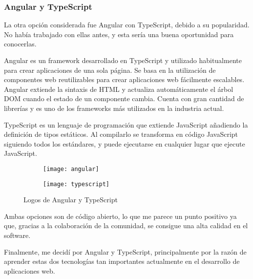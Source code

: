 \subsubsection{Angular y TypeScript}
La otra opción considerada fue Angular con TypeScript, debido a su popularidad. No había trabajado con ellas antes, y esta sería una buena oportunidad para conocerlas.\\
\par Angular es un framework desarrollado en TypeScript y utilizado habitualmente para crear aplicaciones de una sola página. Se basa en la utilización de componentes web reutilizables para crear aplicaciones web fácilmente escalables. Angular extiende la sintaxis de HTML y actualiza automáticamente el árbol DOM cuando el estado de un componente cambia. Cuenta con gran cantidad de librerías y es uno de los frameworks más utilizados en la industria actual\cite{Angular}.\\
\par TypeScript es un lenguaje de programación que extiende JavaScript añadiendo la definición de tipos estáticos. Al compilarlo se transforma en código JavaScript siguiendo todos los estándares, y puede ejecutarse en cualquier lugar que ejecute JavaScript\cite{TypeScript}.
\begin{figure}[H]
	\begin{subfigure}{0.5\textwidth}
	\centering
	\texttt{[image: angular]}
	\end{subfigure}
	\begin{subfigure}{0.5\textwidth}
	\centering
	\texttt{[image: typescript]}
	\end{subfigure}
	\caption {Logos de Angular y TypeScript}
\end{figure}
Ambas opciones son de código abierto, lo que me parece un punto positivo ya que, gracias a la colaboración de la comunidad, se consigue una alta calidad en el software. \\
\par Finalmente, me decidí por Angular y TypeScript, principalmente por la razón de aprender estas dos tecnologías tan importantes actualmente en el desarrollo de aplicaciones web.
